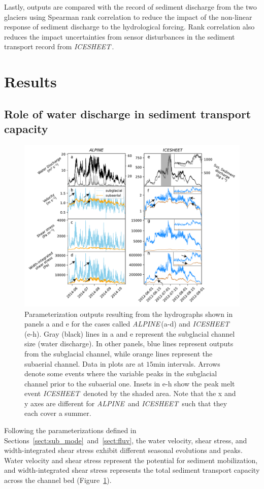\documentclass[11pt]{article}
\newcommand{\ian}[1]{{\textbf{\color{blue}Ian says:} \color{blue} #1} }
\newcommand{\alpine}{\textit{ALPINE}\,}
\newcommand{\icesheet}{\textit{ICESHEET}\,}
\newcommand{\unit}[1]{$\mathrm{#1}$}
\begin{document}
Lastly,  outputs are compared with the record of sediment discharge from the two glaciers using Spearman rank correlation to reduce the impact of the non-linear response of sediment discharge to the hydrological forcing.
Rank correlation also reduces the impact uncertainties from sensor disturbances in the sediment transport record from \icesheet{}.

\section{Results}

\subsection{Role of water discharge in sediment transport capacity}
\begin{figure}[h]
  \centering
  \includegraphics[width=0.9\linewidth]{Fig2.pdf}
  \caption{Parameterization outputs resulting from the hydrographs shown in panels a and e for the cases called \alpine (a-d) and \icesheet{} (e-h). Gray (black) lines in a and e represent the subglacial channel size (water discharge).  In other panels, blue lines represent outputs from the subglacial channel, while orange lines represent the subaerial channel.
    Data in plots are at $15$\unit{min} intervals.
    Arrows denote some events where the variable peaks in the subglacial channel prior to the subaerial one.
    Insets in e-h show the  peak melt event \icesheet{} denoted by the shaded area.
    Note that the x and y axes are different for \alpine{} and \icesheet{} such that they each cover a summer.
  } 
  \label{fig:model_outs}
\end{figure}
Following the parameterizations defined in Sections~\ref{sect:sub_mode}~and~\ref{sect:fluv}, the water velocity, shear stress, and width-integrated shear stress exhibit different seasonal evolutions and peaks. Water velocity and shear stress represent the potential for sediment mobilization, and width-integrated shear stress represents the total sediment transport capacity across the channel bed (Figure~\ref{fig:model_outs}).
\end{document}
